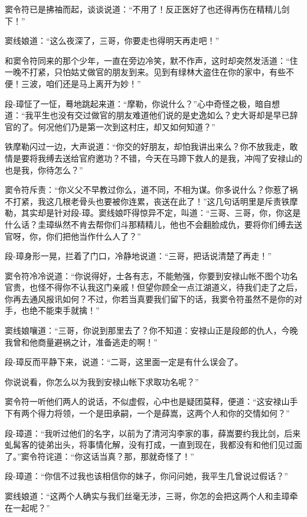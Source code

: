 \documentclass[12pt,oneside]{book}
\begin{document}
窦令符已是拂袖而起，谈谈说道：``不用了！反正医好了也还得再伤在精精儿剑下！''

窦线娘道：``这么夜深了，三哥，你要走也得明天再走吧！''

和窦令符同来的那个少年，一直在旁边冷笑，默不作声，这时却突然发活道：``住一晚不打紧，只怕姑丈做官的朋友到来。见到有绿林大盗住在你的家中，有些不便！三波，咱们还是马上离开为妙！''

段-璋怔了一怔，蓦地跳起来道：``摩勒，你说什么？''心中奇怪之极，暗自想道：``我平生也没有交过做官的朋友难道他们说的是史逸如么？史大哥却是早已辞官的了。何况他们乃是第一次到这村庄，却又如何知道？''

铁摩勒闪过一边，大声说道：``你交的好朋友，却怕我讲出来么？你不放我走，敢情是要将我缚去送给官府邀功？不错，今天在马蹄下救人的是我，冲闯了安禄山的也是我，你待怎么？''

窦令符斥责：``你义父不早教过你么，道不同，不相为谋。你多说什么？你惹了祸不打紧，我这几根老骨头也要被你连累，丧送在此了！''这几句话明里是斥责铁摩勒，其实却是针对段-璋。窦线娘吓得惊异不定，叫道：``三哥、三哥，你，你这是什么话？圭璋纵然不肯去帮你们斗那精精儿，他也不会翻脸成仇，要将你们缚去送官呀，你，你们把他当作什么人了？''

段-璋身形一晃，拦着了门口，冷静地说道：``三哥，把话说清楚了再走！''

窦令符冷冷说道：``你说得好，士各有志，不能勉强，你要到安禄山帐不图个功名官贵，也怪不得你不认我这门亲戚！但望你顾全一点江湖道义，待我们走了之后，你再去通风报讯如何？不过，你若当真要我们留下的话，我窦令符虽然不是你的对手，也绝不能束手就擒！''

窦线娘嚷道：``三哥，你说到那里去了？你不知道：安禄山正是段郎的仇人，今晚我曾和他商量避祸之计，准备逃走的啊！''

段-璋反而平静下来，说道：``二哥，这里面一定是有什么误会了。

你说说看，你怎么以为我到安禄山帐下求取功名呢？''

窦令符一听他们两人的说话，不似虚假，心中也是疑团莫释，便道：``这安禄山手下有两个得力将领，一个是田承嗣，一个是薛嵩，这两个人和你的交情如何？''

段-璋道：``我听过他们的名字，以前为了清河沟李家的事，薛嵩要约我比剑，后来虬髯客的徒弟出头，将事情化解，没有打成，一直到现在，我都没有和他们见过面了。''窦令符诧道：``你这话当真？那，那就奇怪了！''

段-璋道：``你信不过我也该相信你的妹子，你问问她，我平生几曾说过假话？''

窦线娘道：``这两个人确实与我们丝毫无涉，三哥，你怎的会把这两个人和圭璋牵在一起呢？''
\end{document}
